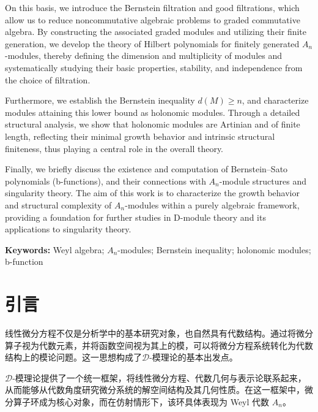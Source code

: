 \documentclass[12pt,a4paper]{ctexrep}   %
\newcommand{\leftchapter}{\ctexset{chapter={format=\zihao{3}\bfseries\raggedright}}}
\begin{document}
On this basis, we introduce the Bernstein filtration and good filtrations, which allow us to reduce noncommutative algebraic problems to graded commutative algebra. By constructing the associated graded modules and utilizing their finite generation, we develop the theory of Hilbert polynomials for finitely generated $A_n$-modules, thereby defining the dimension and multiplicity of modules and systematically studying their basic properties, stability, and independence from the choice of filtration.

Furthermore, we establish the Bernstein inequality $d(M)\ge n$, and characterize modules attaining this lower bound as holonomic modules. Through a detailed structural analysis, we show that holonomic modules are Artinian and of finite length, reflecting their minimal growth behavior and intrinsic structural finiteness, thus playing a central role in the overall theory.

Finally, we briefly discuss the existence and computation of Bernstein--Sato polynomials (b-functions), and their connections with $A_n$-module structures and singularity theory. The aim of this work is to characterize the growth behavior and structural complexity of $A_n$-modules within a purely algebraic framework, providing a foundation for further studies in D-module theory and its applications to singularity theory.

\vspace{1em}
\noindent\textbf{ Keywords: } Weyl algebra; $A_n$-modules; Bernstein inequality; holonomic modules; b-function











\newpage
\tableofcontents


\leftchapter


\newpage
\chapter{引言}
线性微分方程不仅是分析学中的基本研究对象，也自然具有代数结构。通过将微分算子视为代数元素，并将函数空间视为其上的模，可以将微分方程系统转化为代数结构上的模论问题。这一思想构成了$\mathcal{D}$-模理论的基本出发点。

$\mathcal{D}$-模理论提供了一个统一框架，将线性微分方程、代数几何与表示论联系起来，从而能够从代数角度研究微分系统的解空间结构及其几何性质。在这一框架中，微分算子环成为核心对象，而在仿射情形下，该环具体表现为 Weyl 代数 $A_n$。
\end{document}
